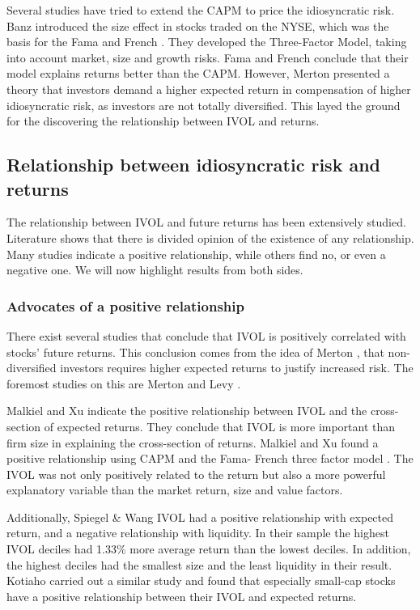 Several studies have tried to extend the CAPM to price the idiosyncratic risk. Banz \cite{banz} introduced the size effect in stocks traded on the NYSE, which was the basis for the Fama and French \cite{famafrench}. They developed the Three-Factor Model, taking into account market, size and growth risks. Fama and French \cite{famafrench} conclude that their model explains returns better than the CAPM. However, Merton \cite{merton87} presented a theory that investors demand a higher expected return in compensation of higher idiosyncratic risk, as investors are not totally diversified. This layed the ground for the discovering the relationship between IVOL and returns.

\subsection{Relationship between idiosyncratic risk and returns}
The relationship between IVOL and future returns has been extensively studied. Literature shows that there is divided opinion of the existence of any relationship. Many studies indicate a positive relationship, while others find no, or even a negative one. We will now highlight results from both sides.

\subsubsection{Advocates of a positive relationship}
There exist several studies that conclude that IVOL is positively correlated with stocks' future returns. This conclusion comes from the idea of Merton \cite{merton87}, that non-diversified investors requires higher expected returns to justify increased risk. The foremost studies on this are Merton \cite{merton73} and Levy \cite{levy}.

Malkiel and Xu \cite{malkielxu02} indicate the positive relationship between IVOL and the cross-section of expected returns. They conclude that IVOL is more important than firm size in explaining the cross-section of returns. Malkiel and Xu \cite{malkielxu04} found a positive relationship using CAPM and the Fama- French three factor model \cite{famafrench}. The IVOL was not only positively related to the return but also a more powerful explanatory variable than the market return, size and value factors.
 
Additionally, Spiegel & Wang  \cite{spiegelwang} IVOL had a positive relationship with expected return, and a negative relationship with liquidity. In their sample the highest IVOL deciles had 1.33\% more average return than the lowest deciles. In addition, the highest deciles had the smallest size and the least liquidity in their result. Kotiaho \cite{kotiaho} carried out a similar study and found that especially small-cap stocks have a positive relationship between their IVOL and expected returns.

